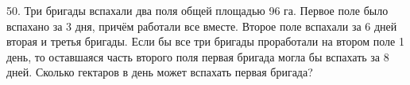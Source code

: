 50. Три бригады вспахали два поля общей площадью 96 га. Первое поле было вспахано за 3 дня, причём работали все вместе. Второе поле вспахали за 6 дней вторая и третья бригады. Если бы все три бригады проработали на втором поле 1 день, то оставшаяся часть второго поля первая бригада могла бы вспахать за 8 дней. Сколько гектаров в день может вспахать первая бригада?\\
